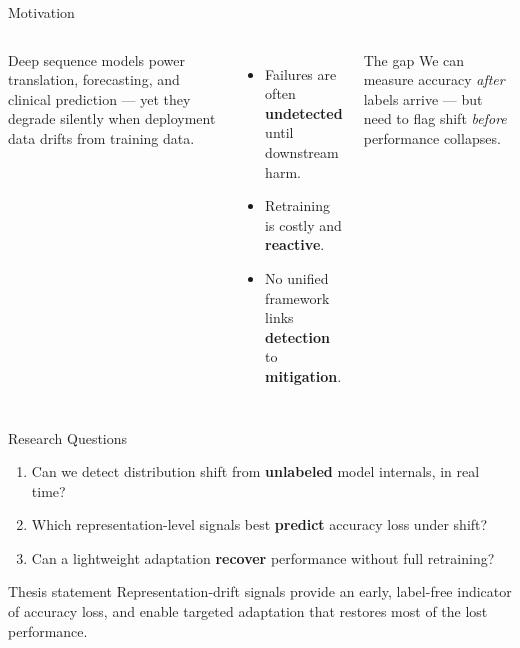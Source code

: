 \documentclass[aspectratio=169,11pt]{beamer}
\begin{document}

\begin{frame}{Motivation}
  \begin{columns}[T]
      Deep sequence models power translation, forecasting, and clinical
      prediction --- yet they \alert{degrade silently} when deployment data drifts
      from training data.
      \begin{itemize}
        \item Failures are often \textbf{undetected} until downstream harm.
        \item Retraining is costly and \textbf{reactive}.
        \item No unified framework links \textbf{detection} to \textbf{mitigation}.
      \end{itemize}
      \begin{block}{The gap}
        We can measure accuracy \emph{after} labels arrive --- but need to flag
        shift \emph{before} performance collapses.
      \end{block}
  \end{columns}
\end{frame}

\begin{frame}{Research Questions}
  \begin{enumerate}
    \item[\textbf{RQ1}] Can we detect distribution shift from \textbf{unlabeled} model
      internals, in real time?
    \item[\textbf{RQ2}] Which representation-level signals best \textbf{predict} accuracy
      loss under shift?
    \item[\textbf{RQ3}] Can a lightweight adaptation \textbf{recover} performance without
      full retraining?
  \end{enumerate}
  \vspace{4pt}
  \begin{block}{Thesis statement}
    Representation-drift signals provide an early, label-free indicator of accuracy loss,
    and enable targeted adaptation that restores most of the lost performance.
  \end{block}
\end{frame}
\end{document}
